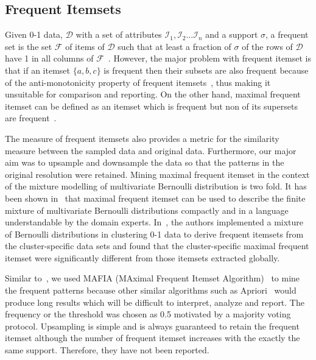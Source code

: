 \subsection{Frequent Itemsets}
\label{ss:frequentitemsets}
Given 0-1 data, $\mathcal{D}$ with a set of attributes $\mathcal{I}_1, \mathcal{I}_2 \ldots \mathcal{I}_n $  and a support $\sigma$, a frequent set is the set  $\mathcal{F}$ of items of  $\mathcal{D}$ such that at least a fraction of $\sigma$ of the rows of $\mathcal{D}$ have 1 in all columns of $\mathcal{F}$~\cite{agrawal, apriori}. However, the major problem with frequent itemset is that if an itemset $\{ a, b, c \}$ is frequent  then their subsets are also frequent because of the anti-monotonicity property of frequent itemsets~\cite{redescription}, thus making it unsuitable for comparison and reporting. On the other hand, maximal frequent itemset can be defined as an itemset which is frequent but non of its supersets are frequent~\cite{mafia}. 

The measure of frequent itemsets also provides a metric for the similarity measure between the sampled data and original data. Furthermore, our major aim was to upsample and downsample the data so that the patterns in the original resolution were retained. Mining maximal frequent itemset in the context of the mixture modelling of multivariate Bernoulli distribution is two fold. It has been shown in~\cite{Holl20071} that maximal frequent itemset can be used to describe the finite mixture of multivariate Bernoulli distributions compactly and in a language understandable by the domain experts. In~\cite{Holl20071}, the authors implemented a mixture of Bernoulli distributions in clustering \mbox{0-1} data to derive frequent itemsets from the cluster-specific data sets and found that the cluster-specific maximal frequent itemset were significantly different from those itemsets extracted globally. 

Similar to~\cite{Holl20071}, we used MAFIA (MAximal Frequent Itemset Algorithm)~\cite{mafia} to mine the frequent patterns because other similar algorithms such as Apriori~\cite{apriori} would produce long results which will be difficult to interpret, analyze and report. The frequency or the threshold was chosen as 0.5 motivated by a majority voting protocol. Upsampling is simple and is always guaranteed to retain the frequent itemset although the number of frequent itemset increases with the exactly the same support. Therefore, they have not been reported.

